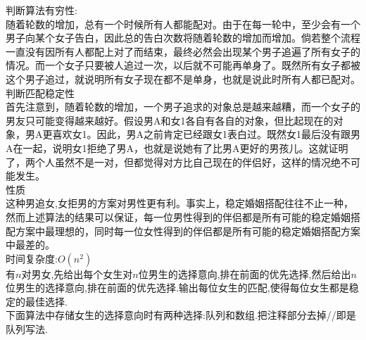 判断算法有穷性: \\
随着轮数的增加，总有一个时候所有人都能配对。由于在每一轮中，至少会有一个男子向某个女子告白，因此总的告白次数将随着轮数的增加而增加。倘若整个流程一直没有因所有人都配上对了而结束，最终必然会出现某个男子追遍了所有女子的情况。而一个女子只要被人追过一次，以后就不可能再单身了。既然所有女子都被这个男子追过，就说明所有女子现在都不是单身，也就是说此时所有人都已配对。 \\

判断匹配稳定性 \\
首先注意到，随着轮数的增加，一个男子追求的对象总是越来越糟，而一个女子的男友只可能变得越来越好。假设男A和女1各自有各自的对象，但比起现在的对象，男A更喜欢女1。因此，男A之前肯定已经跟女1表白过。既然女1最后没有跟男A在一起，说明女1拒绝了男A，也就是说她有了比男A更好的男孩儿。这就证明了，两个人虽然不是一对，但都觉得对方比自己现在的伴侣好，这样的情况绝不可能发生。 \\

性质 \\
这种男追女,女拒男的方案对男性更有利。事实上，稳定婚姻搭配往往不止一种，然而上述算法的结果可以保证，每一位男性得到的伴侣都是所有可能的稳定婚姻搭配方案中最理想的，同时每一位女性得到的伴侣都是所有可能的稳定婚姻搭配方案中最差的。\\

时间复杂度:$O(n^2)$ \\

有$n$对男女,先给出每个女生对$n$位男生的选择意向,排在前面的优先选择,然后给出$n$位男生的选择意向,排在前面的优先选择.输出每位女生的匹配,使得每位女生都是稳定的最佳选择. \\

下面算法中存储女生的选择意向时有两种选择:队列和数组.把注释部分去掉//即是队列写法.

